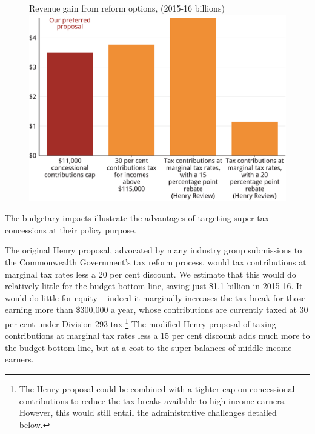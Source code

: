 \begin{figure}
%
{Revenue gain from reform options, (2015-16 billions)}\label{fig:SUPER-4-10}
\includegraphics[width=\linewidth]{b5-super-atlas/Figure4-10-1.pdf}

\end{figure}

The budgetary impacts illustrate the advantages of targeting super tax concessions at their policy purpose. 

The original Henry proposal, advocated by many industry group submissions to the Commonwealth Government’s tax reform process, would tax contributions at marginal tax rates less a 20 per cent discount. We estimate that this would do relatively little for the budget bottom line, saving just \$1.1 billion in 2015-16. It would do little for equity – indeed it marginally increases the tax break for those earning more than \$300,000 a year, whose contributions are currently taxed at 30 per cent under Division 293 tax.\footnote{The Henry proposal could be combined with a tighter cap on concessional contributions to reduce the tax breaks available to high-income earners. However, this would still entail the administrative challenges detailed below.}  The modified Henry proposal of taxing contributions at marginal tax rates less a 15 per cent discount adds much more to the budget bottom line, but at a cost to the super balances of middle-income earners. 

